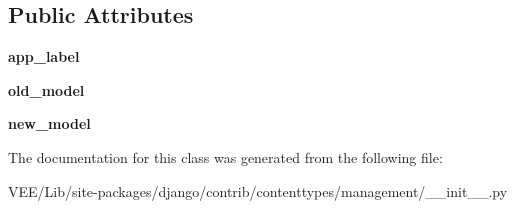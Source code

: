 \subsection*{Public Attributes}
\begin{DoxyCompactItemize}
\item 
\mbox{\label{classdjango_1_1contrib_1_1contenttypes_1_1management_1_1_rename_content_type_ae273425db2e749608b7662b22a1be6d4}} 
{\bfseries app\+\_\+label}
\item 
\mbox{\label{classdjango_1_1contrib_1_1contenttypes_1_1management_1_1_rename_content_type_a2c11303bcde495675279c73926178b1b}} 
{\bfseries old\+\_\+model}
\item 
\mbox{\label{classdjango_1_1contrib_1_1contenttypes_1_1management_1_1_rename_content_type_a0683203f2550a80f00116e7019e4ce7d}} 
{\bfseries new\+\_\+model}
\end{DoxyCompactItemize}


The documentation for this class was generated from the following file\+:\begin{DoxyCompactItemize}
\item 
V\+E\+E/\+Lib/site-\/packages/django/contrib/contenttypes/management/\+\_\+\+\_\+init\+\_\+\+\_\+.\+py\end{DoxyCompactItemize}
